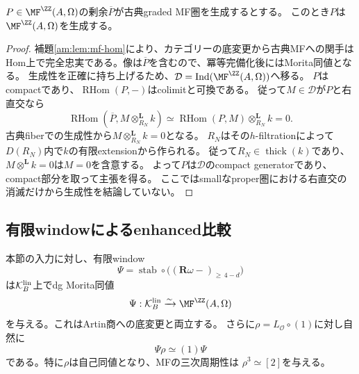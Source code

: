 \begin{lemma}[Artin基底上の生成子の持上げ]\label{am:lem:generator}
$P\in\MF^{\ZZ}(A,\Omega)$の剰余$\overline P$が古典graded MF圏を生成するとする。
このとき$P$は$\MF^{\ZZ}(A,\Omega)$を生成する。
\end{lemma}

\begin{proof}
補題\ref{am:lem:mf-hom}により、カテゴリーの底変更から古典MFへの関手は
Hom上で完全忠実である。像は$\overline P$を含むので、冪等完備化後にはMorita同値となる。
生成性を正確に持ち上げるため、$\mathcal D=\operatorname{Ind}(\MF^{\ZZ}(A,\Omega))$へ移る。
$P$はcompactであり、$\operatorname{RHom}(P,-)$はcolimitと可換である。
従って$M\in\mathcal D$が$P$と右直交なら
\[
 \operatorname{RHom}(\overline P,M\otimes_{R_N}^{\mathbf L}k)
 \simeq\operatorname{RHom}(P,M)\otimes_{R_N}^{\mathbf L}k=0.
\]
古典fiberでの生成性から$M\otimes_{R_N}^{\mathbf L}k=0$となる。
$R_N$はその$h$-filtrationによって$D(R_N)$内で$k$の有限extensionから作られる。
従って$R_N\in\operatorname{thick}(k)$であり、$M\otimes^{\mathbf L}k=0$は$M=0$を含意する。
よって$P$は$\mathcal D$のcompact generatorであり、compact部分を取って主張を得る。
ここではsmallなproper圏における右直交の消滅だけから生成性を結論していない。
\end{proof}

\subsection{有限windowによるenhanced比較}

\begin{theorem}[Artin線束残余pairのMF表示]\label{am:thm:comparison}
本節の入力に対し、有限window
\begin{equation}\label{am:eq:window-functor}
 \Psi=\operatorname{stab}\circ
       \bigl((\mathbf R\omega -)_{\ge\,4-d}\bigr)
\end{equation}
は$\mathcal K_B^{\rm lin}$上でdg Morita同値
\begin{equation}\label{am:eq:residual-mf}
 \Psi:\mathcal K_B^{\rm lin}\xrightarrow{\sim}\MF^{\ZZ}(A,\Omega)
\end{equation}
を与える。これはArtin商への底変更と両立する。
さらに$\rho=L_{\mathcal O}\circ(1)$に対し自然に
\begin{equation}\label{am:eq:rotation}
 \Psi\rho\simeq(1)\Psi
\end{equation}
である。特に$\rho$は自己同値となり、MFの三次周期性は
$\rho^3\simeq[2]$を与える。
\end{theorem}

